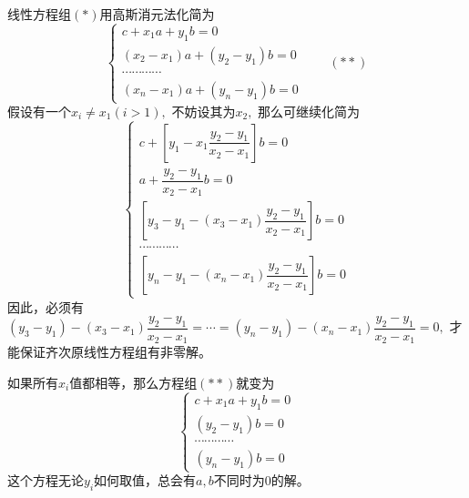 线性方程组$(\ast)$用高斯消元法化简为
$$\begin{cases} c + x_1a + y_1b = 0 \\ (x_2-x_1)a + (y_2-y_1)b = 0 \\ \cdots\cdots\cdots\cdots \\ (x_n-x_1)a + (y_n-y_1)b = 0 \end{cases} \qquad (\ast\ast)$$
假设有一个$x_i \neq x_1 (i > 1),$ 不妨设其为$x_2,$ 那么可继续化简为
$$\begin{cases} c + \left[ y_1 - x_1\dfrac{y_2-y_1}{x_2-x_1} \right] b = 0 \\ a + \dfrac{y_2-y_1}{x_2-x_1}b = 0 \\ \left[ y_3-y_1 - (x_3-x_1)\dfrac{y_2-y_1}{x_2-x_1} \right] b = 0 \\ \cdots\cdots\cdots\cdots \\ \left[ y_n-y_1 - (x_n-x_1)\dfrac{y_2-y_1}{x_2-x_1} \right] b = 0 \end{cases}$$
因此，必须有$(y_3-y_1) - (x_3-x_1)\dfrac{y_2-y_1}{x_2-x_1} = \cdots = (y_n-y_1) - (x_n-x_1)\dfrac{y_2-y_1}{x_2-x_1} = 0,$ 才能保证齐次原线性方程组有非零解。

如果所有$x_i$值都相等，那么方程组$(\ast\ast)$就变为
$$\begin{cases} c + x_1a + y_1b = 0 \\ (y_2-y_1)b = 0 \\ \cdots\cdots\cdots\cdots \\ (y_n-y_1)b = 0 \end{cases}$$
这个方程无论$y_i$如何取值，总会有$a,b$不同时为0的解。

